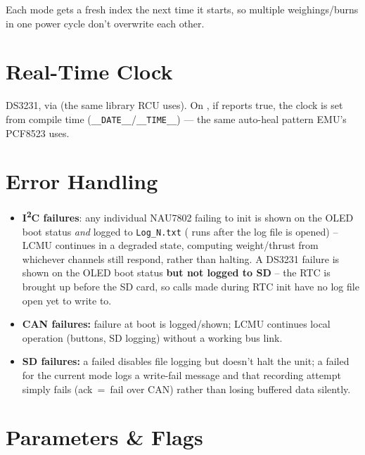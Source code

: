 ﻿\documentclass[11pt,letterpaper]{article}
\begin{document}
Each mode gets a fresh index the next time it starts, so multiple
weighings/burns in one power cycle don't overwrite each other.

\section{Real-Time Clock}

DS3231, via  (the same library RCU uses). On , if
 reports true, the clock is set from compile time
(\texttt{\_\_DATE\_\_}/\texttt{\_\_TIME\_\_}) --- the same auto-heal
pattern EMU's PCF8523 uses.

\section{Error Handling}

\begin{itemize}[nosep]
  \item \textbf{I\textsuperscript{2}C failures}: any individual NAU7802 failing to init is shown on the OLED boot status \emph{and} logged to \texttt{Log\_N.txt} ( runs after the log file is opened) -- LCMU continues in a degraded state, computing weight/thrust from whichever channels still respond, rather than halting. A DS3231 failure is shown on the OLED boot status \textbf{but not logged to SD} -- the RTC is brought up before the SD card, so  calls made during RTC init have no log file open yet to write to.
  \item \textbf{CAN failures:}  failure at boot is logged/shown; LCMU continues local operation (buttons, SD logging) without a working bus link.
  \item \textbf{SD failures:} a failed  disables file logging but doesn't halt the unit; a failed  for the current mode logs a write-fail message and that recording attempt simply fails (ack~=~fail over CAN) rather than losing buffered data silently.
\end{itemize}

\section{Parameters \& Flags}
\end{document}
